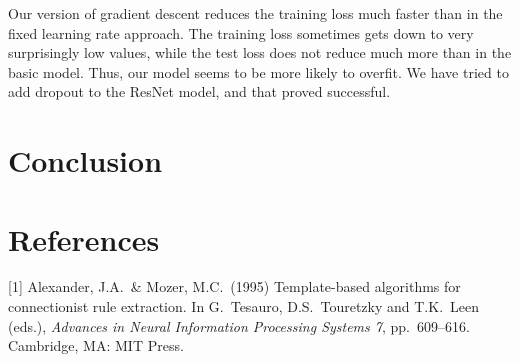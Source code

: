 \documentclass{article}
\begin{document}
  Our version of gradient descent reduces the training loss much faster than in the fixed learning rate approach. The training loss sometimes gets down to very surprisingly low values, while the test loss does not reduce much more than in the basic model. Thus, our model seems to be more likely to overfit. We have tried to add dropout to the ResNet model, and that proved successful. 
  
  \section{Conclusion}
  
  
  \section*{References}
  
  \medskip
  
  \small
  
  [1] Alexander, J.A.\ \& Mozer, M.C.\ (1995) Template-based algorithms
  for connectionist rule extraction. In G.\ Tesauro, D.S.\ Touretzky and
  T.K.\ Leen (eds.), {\it Advances in Neural Information Processing
    Systems 7}, pp.\ 609--616. Cambridge, MA: MIT Press.
  
  
  
\end{document}
